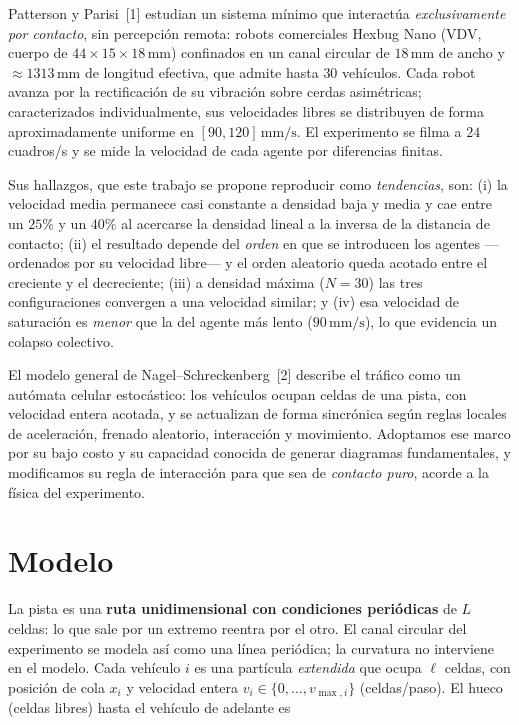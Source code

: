 \documentclass[11pt,a4paper]{article}
\newcommand{\unit}[1]{\,\mathrm{#1}}
\begin{document}
Patterson y Parisi~[1] estudian un sistema mínimo que interactúa \emph{exclusivamente
por contacto}, sin percepción remota: robots comerciales Hexbug Nano (VDV, cuerpo de
$44\times15\times18\unit{mm}$) confinados en un canal circular de
$18\unit{mm}$ de ancho y $\approx1313\unit{mm}$ de longitud efectiva, que admite hasta
$30$ vehículos. Cada robot avanza por la rectificación de su vibración sobre cerdas
asimétricas; caracterizados individualmente, sus velocidades libres se distribuyen de
forma aproximadamente uniforme en $[90,120]\unit{mm/s}$. El experimento se filma a
$24$ cuadros/s y se mide la velocidad de cada agente por diferencias finitas.

Sus hallazgos, que este trabajo se propone reproducir como \emph{tendencias}, son:
(i) la velocidad media permanece casi constante a densidad baja y media y cae entre
un $25\%$ y un $40\%$ al acercarse la densidad lineal a la inversa de la distancia de
contacto; (ii) el resultado depende del \emph{orden} en que se introducen los agentes
—ordenados por su velocidad libre— y el orden aleatorio queda acotado entre el
creciente y el decreciente; (iii) a densidad máxima ($N=30$) las tres configuraciones
convergen a una velocidad similar; y (iv) esa velocidad de saturación es \emph{menor}
que la del agente más lento ($90\unit{mm/s}$), lo que evidencia un colapso colectivo.

El modelo general de Nagel--Schreckenberg~[2] describe el tráfico como un autómata
celular estocástico: los vehículos ocupan celdas de una pista, con velocidad entera
acotada, y se actualizan de forma sincrónica según reglas locales de aceleración,
frenado aleatorio, interacción y movimiento. Adoptamos ese marco por su bajo costo y
su capacidad conocida de generar diagramas fundamentales, y modificamos su regla de
interacción para que sea de \emph{contacto puro}, acorde a la física del experimento.

\section{Modelo}

La pista es una \textbf{ruta unidimensional con condiciones periódicas} de $L$
celdas: lo que sale por un extremo reentra por el otro. El canal circular del
experimento se modela así como una línea periódica; la curvatura no interviene en el
modelo. Cada vehículo $i$ es una partícula \emph{extendida} que ocupa $\ell$ celdas,
con posición de cola $x_i$ y velocidad entera $v_i\in\{0,\dots,v_{\max,i}\}$
(celdas/paso). El hueco (celdas libres) hasta el vehículo de adelante es
\end{document}
